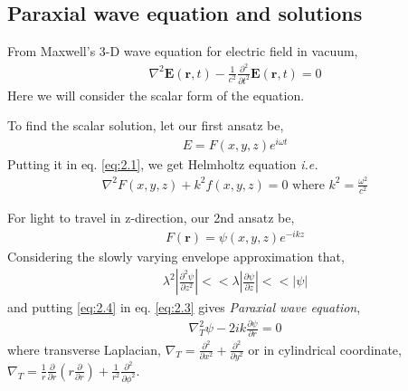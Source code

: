 \documentclass[11pt,a4paper]{article}
\numberwithin{equation}{section}
\begin{document}
\subsection{Paraxial wave equation and solutions}
From Maxwell's 3-D wave equation for electric field in vacuum,
\begin{align}
	\nabla^2\boldsymbol{E}(\boldsymbol{r},t) - \frac{1}{c^2}\frac{\partial^2}{\partial t^2}\boldsymbol{E}(\boldsymbol{r},t)=0 \label{eq:2.1}
\end{align}
Here we will consider the scalar form of the equation.

To find the scalar solution, let our first ansatz be,
\begin{align}
	{E}= {F}(x,y,z) e^{i\omega t} \label{eq:2.2}
\end{align}
Putting it in eq. \ref{eq:2.1}, we get Helmholtz equation \textit{i.e.} 
\begin{align}
	\nabla^2{F}(x,y,z) + k^2{f}(x,y,z)=0
	\text{ where }k^2 = \frac{\omega^2}{c^2} \label{eq:2.3}
\end{align}

For light to travel in z-direction, our 2nd ansatz be,
\begin{align}
	{F}(\boldsymbol{r}) = \psi(x,y,z)e^{-ikz}  \label{eq:2.4} 
\end{align}
Considering the slowly varying envelope approximation\cite{WO} that,
\begin{align}
	\lambda^2 \left|\frac{\partial^2\psi}{\partial z^2}\right|<<
	\lambda \left|\frac{\partial\psi}{\partial z}\right| <<
	\left|\psi\right|
\end{align}
and putting \ref{eq:2.4} in eq. \ref{eq:2.3} gives \textit{Paraxial wave equation},
\begin{align}
	\nabla_T ^2\psi -2ik \frac{\partial\psi}{\partial r}=0 \label{eq:2.6}
\end{align}
where transverse Laplacian, $\displaystyle\nabla_T = \frac{\partial^2}{\partial x^2}+\frac{\partial^2}{\partial y^2}$ or in cylindrical coordinate, $\displaystyle\nabla_T = \frac{1}{r}\frac{\partial}{\partial r}\left(r\frac{\partial}{\partial r}\right) + \frac{1}{r^2}\frac{\partial^2}{\partial \phi^2}$.
\end{document}
